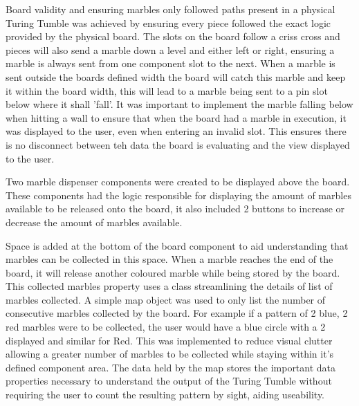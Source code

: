 \documentclass{l4proj}
\begin{document}
Board validity and ensuring marbles only followed paths present in a physical Turing Tumble was achieved by ensuring every piece followed the exact logic provided by the physical board. The slots on the board follow a criss cross and pieces will also send a marble down a level and either left or right, ensuring a marble is always sent from one component slot to the next. When a marble is sent outside the boards defined width the board will catch this marble and keep it within the board width, this will lead to a marble being sent to a pin slot below where it shall 'fall'. It was important to implement the marble falling below when hitting a wall to ensure that when the board had a marble in execution, it was displayed to the user, even when entering an invalid slot. This ensures there is no disconnect between teh data the board is evaluating and the view displayed to the user.

Two marble dispenser components were created to be displayed above the board. These components had the logic responsible for displaying the amount of marbles available to be released onto the board, it also included 2 buttons to increase or decrease the amount of marbles available. 

Space is added at the bottom of the board component to aid understanding that marbles can be collected in this space. When a marble reaches the end of the board, it will release another coloured marble while being stored by the board. This collected marbles property uses a class streamlining the details of list of marbles collected. A simple map object was used to only list the number of consecutive marbles collected by the board. For example if a pattern of 2 blue, 2 red marbles were to be collected, the user would have a blue circle with a 2 displayed and similar for Red. This was implemented to reduce visual clutter allowing a greater number of marbles to be collected while staying within it's defined component area. The data held by the map stores the important data properties necessary to understand the output of the Turing Tumble without requiring the user to count the resulting pattern by sight, aiding useability.   
\end{document}
